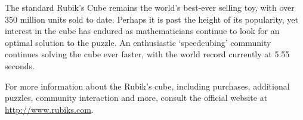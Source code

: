 	The standard Rubik's Cube remains the world's best-ever selling toy, with over 350 million units sold to date. Perhaps it is past the height of its popularity, yet interest in the cube has endured as mathematicians continue to look for an optimal solution to the puzzle. An enthusiastic `speedcubing' community continues solving the cube ever faster, with the world record currently at 5.55 seconds.
	
	For more information about the Rubik's cube, including purchases, additional puzzles, community interaction and more, consult the official website at \url{http://www.rubiks.com}.
	